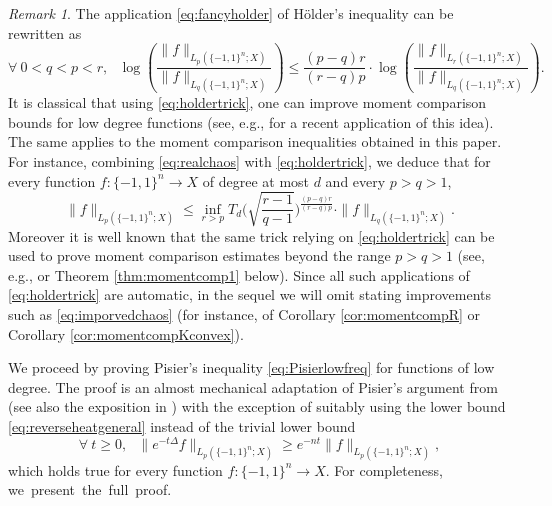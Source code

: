 \documentclass[11pt,reqno]{amsart}
\renewcommand{\leq}{\leqslant}
\renewcommand{\geq}{\geqslant}
\newcommand{\1}{\mathbf 1}
\theoremstyle{remark}
\newtheorem{remark}[theorem]{Remark}
\begin{document}
\begin{remark} \label{rem:momentboost}
The application \eqref{eq:fancyholder} of H\"older's inequality can be rewritten as
\begin{equation} \label{eq:holdertrick}
\forall \ 0<q<p<r, \ \ \ \log\left( \frac{\|f\|_{L_p(\{-1,1\}^n;X)}}{\|f\|_{L_q(\{-1,1\}^n;X)}}\right) \leq \frac{(p-q)r}{(r-q)p} \cdot \log\left( \frac{\|f\|_{L_r(\{-1,1\}^n;X)}}{\|f\|_{L_q(\{-1,1\}^n;X)}}\right).
\end{equation}
It is classical that using \eqref{eq:holdertrick}, one can improve moment comparison bounds for low degree functions (see, e.g., \cite{IT18} for a recent application of this idea). The same applies to the moment comparison inequalities obtained in this paper. For instance, combining \eqref{eq:realchaos} with \eqref{eq:holdertrick}, we deduce that for every function $f:\{-1,1\}^n\to X$ of degree at most $d$ and every $p>q>1$,
\begin{equation} \label{eq:imporvedchaos}
\|f\|_{L_p(\{-1,1\}^n;X)} \leq \inf_{r>p} T_d\Big(\sqrt{\frac{r-1}{q-1}}\Big)^{\frac{(p-q)r}{(r-q)p}} \cdot \|f\|_{L_q(\{-1,1\}^n;X)}.
\end{equation}
Moreover it is well known that the same trick relying on \eqref{eq:holdertrick} can be used to prove moment comparison estimates beyond the range $p>q>1$ (see, e.g.,  \cite[Theorem~9.22]{O'D14} or Theorem \ref{thm:momentcomp1} below). Since all such applications of \eqref{eq:holdertrick} are automatic, in the sequel we will omit stating improvements such as \eqref{eq:imporvedchaos} (for instance, of Corollary \ref{cor:momentcompR} or Corollary \ref{cor:momentcompKconvex}).
\end{remark}

We proceed by proving Pisier's inequality \eqref{eq:Pisierlowfreq} for functions of low degree. The proof is an almost mechanical adaptation of Pisier's argument from \cite{Pis86} (see also the exposition in \cite{Nao12}) with the exception of suitably using the lower bound \eqref{eq:reverseheatgeneral} instead of the trivial lower bound 
\begin{equation}
\forall \ t\geq0, \ \ \ \|e^{-t\Delta}f\|_{L_p(\{-1,1\}^n;X)} \geq e^{-nt}\|f\|_{L_p(\{-1,1\}^n;X)},
\end{equation} 
which holds true for every function $f:\{-1,1\}^n\to X$. For completeness, we\mbox{ present the full proof.}

\medskip
\end{document}
